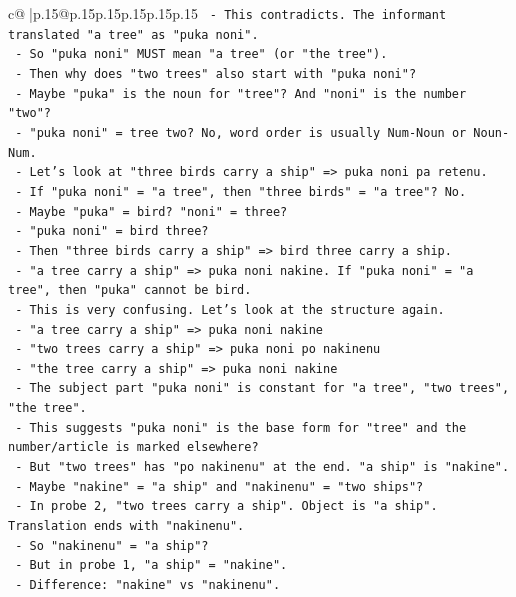 \documentclass{article}
\begin{document}
{\begin{supertabular}{c@{$\;$}|p{.15\linewidth}@{}p{.15\linewidth}p{.15\linewidth}p{.15\linewidth}p{.15\linewidth}p{.15\linewidth}}
{{{\texttt{  {-} This contradicts. The informant translated "a tree" as "puka noni".} \\
\texttt{  {-} So "puka noni" MUST mean "a tree" (or "the tree").} \\
\texttt{  {-} Then why does "two trees" also start with "puka noni"?} \\
\texttt{  {-} Maybe "puka" is the noun for "tree"? And "noni" is the number "two"?} \\
\texttt{  {-} "puka noni" = tree two? No, word order is usually Num{-}Noun or Noun{-}Num.} \\
\texttt{  {-} Let's look at "three birds carry a ship" => puka noni pa retenu.} \\
\texttt{  {-} If "puka noni" = "a tree", then "three birds" = "a tree"? No.} \\
\texttt{  {-} Maybe "puka" = bird? "noni" = three?} \\
\texttt{  {-} "puka noni" = bird three?} \\
\texttt{  {-} Then "three birds carry a ship" => bird three carry a ship.} \\
\texttt{  {-} "a tree carry a ship" => puka noni nakine. If "puka noni" = "a tree", then "puka" cannot be bird.} \\
\texttt{  {-} This is very confusing. Let's look at the structure again.} \\
\texttt{  {-} "a tree carry a ship" => puka noni nakine} \\
\texttt{  {-} "two trees carry a ship" => puka noni po nakinenu} \\
\texttt{  {-} "the tree carry a ship" => puka noni nakine} \\
\texttt{  {-} The subject part "puka noni" is constant for "a tree", "two trees", "the tree".} \\
\texttt{  {-} This suggests "puka noni" is the base form for "tree" and the number/article is marked elsewhere?} \\
\texttt{  {-} But "two trees" has "po nakinenu" at the end. "a ship" is "nakine".} \\
\texttt{  {-} Maybe "nakine" = "a ship" and "nakinenu" = "two ships"?} \\
\texttt{  {-} In probe 2, "two trees carry a ship". Object is "a ship". Translation ends with "nakinenu".} \\
\texttt{  {-} So "nakinenu" = "a ship"?} \\
\texttt{  {-} But in probe 1, "a ship" = "nakine".} \\
\texttt{  {-} Difference: "nakine" vs "nakinenu".} \\
}}}
\end{supertabular}}
\end{document}
